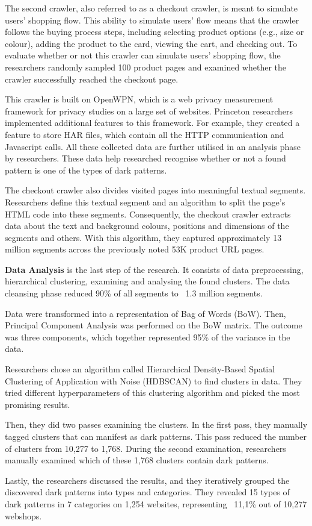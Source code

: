 The second crawler, also referred to as a checkout crawler, is meant to simulate users' shopping flow. This ability to simulate users' flow means that the crawler follows the buying process steps, including selecting product options (e.g., size or colour), adding the product to the card, viewing the cart, and checking out. To evaluate whether or not this crawler can simulate users' shopping flow, the researchers randomly sampled 100 product pages and examined whether the crawler successfully reached the checkout page.

This crawler is built on OpenWPN, which is a web privacy measurement framework for privacy studies on a large set of websites. Princeton researchers implemented additional features to this framework. For example, they created a feature to store HAR files, which contain all the HTTP communication and Javascript calls. All these collected data are further utilised in an analysis phase by researchers. These data help researched recognise whether or not a found pattern is one of the types of dark patterns.

The checkout crawler also divides visited pages into meaningful textual segments. Researchers define this textual segment and an algorithm to split the page's HTML code into these segments\cite{dark-patterns-at-scale}. Consequently, the checkout crawler extracts data about the text and background colours, positions and dimensions of the segments and others. With this algorithm, they captured approximately 13 million segments across the previously noted 53K product URL pages.

\textbf{Data Analysis} is the last step of the research. It consists of data preprocessing, hierarchical clustering, examining and analysing the found clusters. The data cleansing phase reduced 90\% of all segments to ~1.3 million segments.

Data were transformed into a representation of Bag of Words (BoW)\cite{bag-of-words}. Then, Principal Component Analysis was performed on the BoW matrix. The outcome was three components, which together represented 95\% of the variance in the data. 

Researchers chose an algorithm called Hierarchical Density-Based Spatial Clustering of Application with Noise (HDBSCAN)\cite{hdbscan} to find clusters in data. They tried different hyperparameters of this clustering algorithm and picked the most promising results.

Then, they did two passes examining the clusters. In the first pass, they manually tagged clusters that can manifest as dark patterns. This pass reduced the number of clusters from 10,277 to 1,768. During the second examination, researchers manually examined which of these 1,768 clusters contain dark patterns\cite{dark-patterns-at-scale}.

Lastly, the researchers discussed the results, and they iteratively grouped the discovered dark patterns into types and categories. They revealed 15 types of dark patterns in 7 categories on 1,254 websites, representing ~11,1\% out of 10,277 webshops\cite{dark-patterns-at-scale}.


